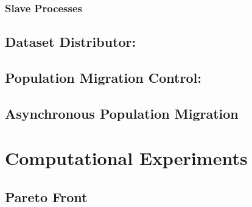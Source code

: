 \documentclass[conference]{IEEEtran}
\begin{document}
  \subsubsection{Slave Processes}\mbox{}
  
	\subsection{Dataset Distributor:}
	
  \subsection{Population Migration Control:}
  
	
  \subsection{Asynchronous Population Migration}
  
  
  \section{Computational Experiments}

  \subsection{Pareto Front}
\end{document}
